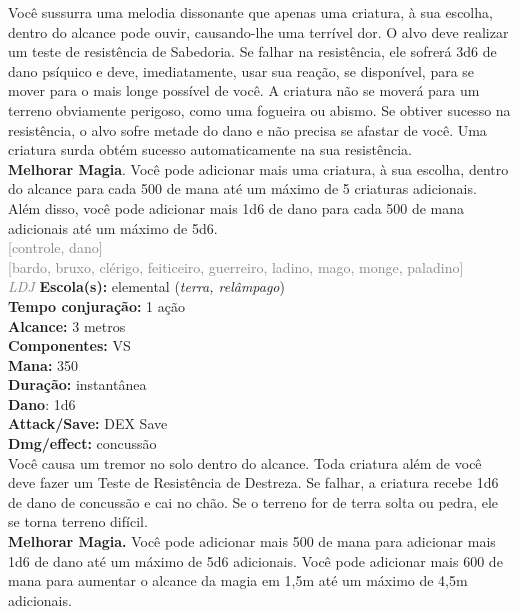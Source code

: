 \documentclass{RPG_Adventure}[2021/10/20]
\begin{document}
{\normalsize Você sussurra uma melodia dissonante que apenas uma criatura, à sua escolha, dentro do alcance pode ouvir, causando-lhe uma terrível dor. O alvo deve realizar um teste de resistência de Sabedoria. Se falhar na resistência, ele sofrerá 3d6 de dano psíquico e deve, imediatamente, usar sua reação, se disponível, para se mover para o mais longe possível de você. A criatura não se moverá para um terreno obviamente perigoso, como uma fogueira ou abismo. Se obtiver sucesso na resistência, o alvo sofre metade do dano e não precisa se afastar de você. Uma criatura surda obtém sucesso automaticamente na sua resistência.\\\t \textbf{Melhorar Magia}. Você pode adicionar mais uma criatura, à sua escolha, dentro do alcance para cada 500 de mana até um máximo de 5 criaturas adicionais. Além disso, você pode adicionar mais 1d6 de dano para cada 500 de mana adicionais até um máximo de 5d6.\\}
{\scriptsize \textcolor{gray}{[controle, dano]\\}}
{\scriptsize \textcolor{gray}{[bardo, bruxo, clérigo, feiticeiro, guerreiro, ladino, mago, monge, paladino]\\}}
{\tiny \textcolor{gray}{\textit{LDJ}}}
{\small \t \textbf{Escola(s):} elemental (\textit{terra, relâmpago})\\\t \textbf{Tempo conjuração:} 1 ação\\\t \textbf{Alcance:} 3 metros\\\t \textbf{Componentes:} VS\\\t \textbf{Mana:} 350\\\t \textbf{Duração:} instantânea\\\t \textbf{Dano}: 1d6\\\t \textbf{Attack/Save:} DEX Save\\\t \textbf{Dmg/effect:} concussão\\}
{\normalsize Você causa um tremor no solo dentro do alcance. Toda criatura além de você deve fazer um Teste de Resistência de Destreza. Se falhar, a criatura recebe 1d6 de dano de concussão e cai no chão. Se o terreno for de terra solta ou pedra, ele se torna terreno difícil.\\\t \textbf{Melhorar Magia.} Você pode adicionar mais 500 de mana para adicionar mais 1d6 de dano até um máximo de 5d6 adicionais. Você pode adicionar mais 600 de mana para aumentar o alcance da magia em 1,5m até um máximo de 4,5m adicionais.\\}
\end{document}
